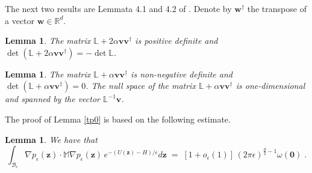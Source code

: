 \documentclass[reqno]{amsart}
\newtheorem{lemma}[theorem]{Lemma}
\newcounter{as}[section]
\newcommand{\mc}[1]{{\mathcal #1}}
\newcommand{\bb}[1]{{\mathbb #1}}
\newcommand{\bs}[1]{{\boldsymbol #1}}
\newcommand{\<}{\langle}
\renewcommand{\>}{\rangle}
\begin{document}
The next two results are Lemmata 4.1 and 4.2  of \cite{LS1}. Denote by
$\bs w ^{\dagger}$ the transpose of a vector $\bs w\in\bb R^d$.

\begin{lemma}
\label{bl2}
The matrix $\bb{L}+2\alpha\bs{v}\bs{v}^{\dagger}$ is positive definite and
$\det(\bb{L}+2\alpha\bs{v}\bs{v}^{\dagger})=-\det\bb{L}$.
\end{lemma}

\begin{lemma}
\label{bl3}
The matrix $\bb{L}+\alpha\bs{v}\bs{v}^{\dagger}$ is non-negative definite
and $\det(\bb{L}+\alpha\bs{v}\bs{v}^{\dagger})=0$.  The null space of the
matrix $\bb{L}+\alpha\bs{v}\bs{v}^{\dagger}$ is one-dimensional and
spanned by the vector $\bb{L}^{-1}\bs{v}$.
\end{lemma}

 The proof of Lemma \ref{tp0}
is based on the following estimate.

\begin{lemma}
\label{bl6}
We have that
\begin{equation*}
\int_{\mc{B}_{\epsilon}}\nabla p_{\epsilon}(\bs{z})
\cdot\bb{M}\nabla p_{\epsilon}(\bs{z})
\, e^{-\left(U(\bs{z})-H\right)/\epsilon}d\bs{z}
\;=\;\left[1+o_{\epsilon}(1)\right]\,(2\pi\epsilon)^{\frac{d}{2}-1}
\omega(\bs{0})\;.
\end{equation*}
\end{lemma}
\end{document}
